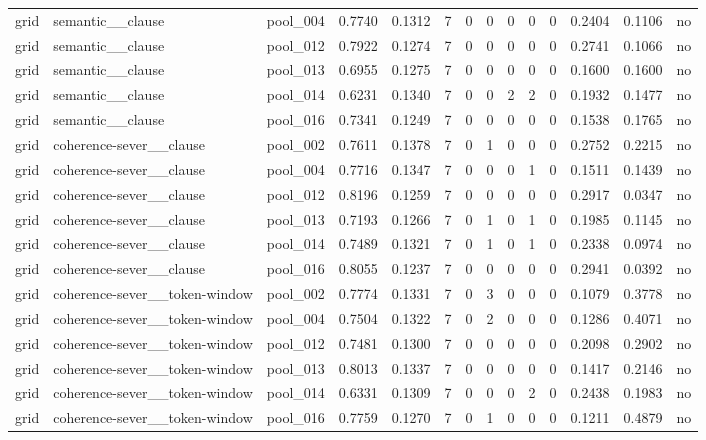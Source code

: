 \begin{table}[t]
{\begin{tabular}{llllllllllllll}
grid & semantic\_\_clause & pool\_004 & 0.7740 & 0.1312 & 7 & 0 & 0 & 0 & 0 & 0 & 0.2404 & 0.1106 & no \\
grid & semantic\_\_clause & pool\_012 & 0.7922 & 0.1274 & 7 & 0 & 0 & 0 & 0 & 0 & 0.2741 & 0.1066 & no \\
grid & semantic\_\_clause & pool\_013 & 0.6955 & 0.1275 & 7 & 0 & 0 & 0 & 0 & 0 & 0.1600 & 0.1600 & no \\
grid & semantic\_\_clause & pool\_014 & 0.6231 & 0.1340 & 7 & 0 & 0 & 2 & 2 & 0 & 0.1932 & 0.1477 & no \\
grid & semantic\_\_clause & pool\_016 & 0.7341 & 0.1249 & 7 & 0 & 0 & 0 & 0 & 0 & 0.1538 & 0.1765 & no \\
grid & coherence-sever\_\_clause & pool\_002 & 0.7611 & 0.1378 & 7 & 0 & 1 & 0 & 0 & 0 & 0.2752 & 0.2215 & no \\
grid & coherence-sever\_\_clause & pool\_004 & 0.7716 & 0.1347 & 7 & 0 & 0 & 0 & 1 & 0 & 0.1511 & 0.1439 & no \\
grid & coherence-sever\_\_clause & pool\_012 & 0.8196 & 0.1259 & 7 & 0 & 0 & 0 & 0 & 0 & 0.2917 & 0.0347 & no \\
grid & coherence-sever\_\_clause & pool\_013 & 0.7193 & 0.1266 & 7 & 0 & 1 & 0 & 1 & 0 & 0.1985 & 0.1145 & no \\
grid & coherence-sever\_\_clause & pool\_014 & 0.7489 & 0.1321 & 7 & 0 & 1 & 0 & 1 & 0 & 0.2338 & 0.0974 & no \\
grid & coherence-sever\_\_clause & pool\_016 & 0.8055 & 0.1237 & 7 & 0 & 0 & 0 & 0 & 0 & 0.2941 & 0.0392 & no \\
grid & coherence-sever\_\_token-window & pool\_002 & 0.7774 & 0.1331 & 7 & 0 & 3 & 0 & 0 & 0 & 0.1079 & 0.3778 & no \\
grid & coherence-sever\_\_token-window & pool\_004 & 0.7504 & 0.1322 & 7 & 0 & 2 & 0 & 0 & 0 & 0.1286 & 0.4071 & no \\
grid & coherence-sever\_\_token-window & pool\_012 & 0.7481 & 0.1300 & 7 & 0 & 0 & 0 & 0 & 0 & 0.2098 & 0.2902 & no \\
grid & coherence-sever\_\_token-window & pool\_013 & 0.8013 & 0.1337 & 7 & 0 & 0 & 0 & 0 & 0 & 0.1417 & 0.2146 & no \\
grid & coherence-sever\_\_token-window & pool\_014 & 0.6331 & 0.1309 & 7 & 0 & 0 & 0 & 2 & 0 & 0.2438 & 0.1983 & no \\
grid & coherence-sever\_\_token-window & pool\_016 & 0.7759 & 0.1270 & 7 & 0 & 1 & 0 & 0 & 0 & 0.1211 & 0.4879 & no \\

\end{tabular}}
\end{table}
